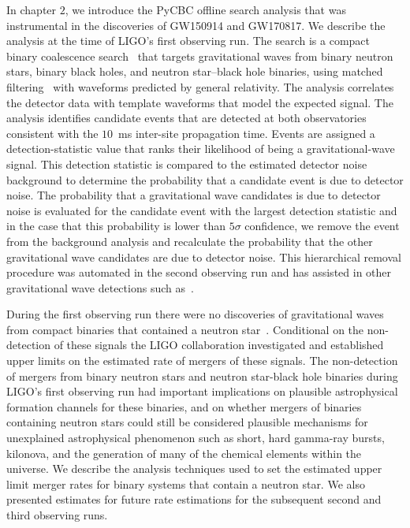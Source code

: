 In chapter $2$, we introduce the PyCBC offline search analysis that was instrumental in the discoveries of GW150914 and GW170817. We describe the analysis at the time of LIGO's first observing run. The \pycbc{} search is a compact binary coalescence search~\cite{thorne.k:1987,Sathyaprakash:1991mt,Cutler:1992tc,Finn:1992wt,Finn:1992xs,Dhurandhar:1992mw,Balasubramanian:1995bm,Flanagan:1997sx} that targets gravitational waves from binary neutron stars, binary black holes, and neutron star--black hole binaries, using matched filtering~\cite{wainstein:1962} with waveforms predicted by general relativity.  The \pycbc{} analysis correlates the detector data with template waveforms that model the expected signal. The analysis identifies candidate events that are detected at both observatories consistent with the $10$~ms inter-site propagation time. Events are assigned a detection-statistic value that ranks their likelihood of being a gravitational-wave signal. This detection statistic is compared to the estimated detector noise background to determine the probability that a candidate event is due to detector noise. The probability that a gravitational wave candidates is due to detector noise is evaluated for the candidate event with the largest detection statistic and in the case that this probability is lower than $5 \sigma$ confidence, we remove the event from the background analysis and recalculate the probability that the other gravitational wave candidates are due to detector noise. This hierarchical removal procedure was automated in the second observing run and has assisted in other gravitational wave detections such as~\cite{abbott2017gw170814}.

During the first observing run there were no discoveries of gravitational waves from compact binaries that contained a neutron star~\cite{O1BBH}. Conditional on the non-detection of these signals the LIGO collaboration investigated and established upper limits on the estimated rate of mergers of these signals. The non-detection of mergers from binary neutron stars and neutron star-black hole binaries during LIGO's first observing run had important implications on plausible astrophysical formation channels for these binaries, and on whether mergers of binaries containing neutron stars could still be considered plausible mechanisms for unexplained astrophysical phenomenon such as short, hard gamma-ray bursts, kilonova, and the generation of many of the chemical elements within the universe. We describe the analysis techniques used to set the estimated upper limit merger rates for binary systems that contain a neutron star. We also presented estimates for future rate estimations for the subsequent second and third observing runs.

